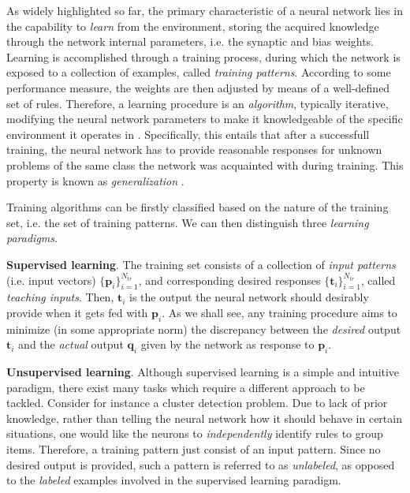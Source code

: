 \documentclass[11pt, a4paper]{report}
\numberwithin{equation}{chapter}
\theoremstyle{theorem}
\theoremstyle{definition}
\numberwithin{figure}{section}
\begin{document}
		As widely highlighted so far, the primary characteristic of a neural network lies in the capability to \emph{learn} from the environment, storing the acquired knowledge through the network internal parameters, i.e. the synaptic and bias weights. Learning is accomplished through a training process, during which the network is exposed to a collection of examples, called \emph{training patterns}. According to some performance measure, the weights are then adjusted by means of a well-defined set of rules. Therefore, a learning procedure is an \emph{algorithm}, typically iterative, modifying the neural network parameters to make it knowledgeable of the specific environment it operates in \cite{Hay05}. Specifically, this entails that after a successfull training, the neural network has to provide reasonable responses for unknown problems of the same class the network was acquainted with during training. This property is known as \emph{generalization} \cite{Kri}. 
		
		Training algorithms can be firstly classified based on the nature of the training set, i.e. the set of training patterns. We can then distinguish three \emph{learning paradigms}.
		
		\vspace*{0.3cm}
		
		\noindent \textbf{Supervised learning}. The training set consists of a collection of \emph{input patterns} (i.e. input vectors) $\lbrace \boldsymbol{p}_i \rbrace_{i = 1}^{N_{tr}}$, and corresponding desired responses $\lbrace \boldsymbol{t}_i \rbrace_{i = 1}^{N_{tr}}$, called \emph{teaching inputs}. Then, $\boldsymbol{t}_i$ is the output the neural network should desirably provide when it gets fed with $\boldsymbol{p}_i$. As we shall see, any training procedure aims to minimize (in some appropriate norm) the discrepancy between the \emph{desired} output $\boldsymbol{t}_i$ and the \emph{actual} output $\boldsymbol{q}_i$ given by the network as response to $\boldsymbol{p}_i$. 
		
		\vspace*{0.3cm}
		
		\noindent \textbf{Unsupervised learning}. Although supervised learning is a simple and intuitive paradigm, there exist many tasks which require a different approach to be tackled. Consider for instance a cluster detection problem. Due to lack of prior knowledge, rather than telling the neural network how it should behave in certain situations, one would like the neurons to \emph{independently} identify rules to group items. Therefore, a training pattern just consist of an input pattern. Since no desired output is provided, such a pattern is referred to as \emph{unlabeled}, as opposed to the \emph{labeled} examples involved in the supervised learning paradigm.
		
\end{document}
